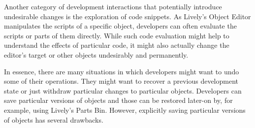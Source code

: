Another category of development interactions that potentially introduce undesirable changes is the exploration of code snippets.
As Lively's Object Editor manipulates the scripts of a specific object, developers can often evaluate the scripts or parts of them directly.
While such code evaluation might help to understand the effects of particular code, it might also actually change the editor's target or other objects undesirably and permanently.

In essence, there are many situations in which developers might want to undo some of their operations.
They might want to recover a previous development state or just withdraw particular changes to particular objects.
Developers can save particular versions of objects and those can be restored later-on by, for example, using Lively's Parts Bin.
However, explicitly saving particular versions of objects has several drawbacks.



